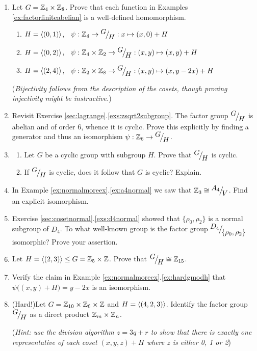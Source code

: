 \begin{exercises}
\begin{enumerate}
	
	 	\item Let $G=\mathbb{Z}_4\times\mathbb{Z}_8$. Prove that each function in Examples \ref{ex:factorfiniteabelian} is a well-defined homomorphism.
		\begin{enumerate}\itemsep0pt
			\item $H=\left\langle (0,1)\right\rangle$, \ $\psi:\mathbb{Z}_4\to\smash[t]{{}^{\textstyle {G}}\!\big/_{\textstyle \!{H}}}:x\mapsto (x,0)+H$
			\item $H=\left\langle (0,2)\right\rangle$, \ $\psi:\mathbb{Z}_4\times\mathbb{Z}_2\to{}^{\textstyle {G}}\!\big/_{\textstyle \!{H}}:(x,y)\mapsto (x,y)+H$
			\item $H=\left\langle (2,4)\right\rangle$, \ $\psi:\mathbb{Z}_2\times\mathbb{Z}_8\to{}^{\textstyle {G}}\!\big/_{\textstyle \!{H}}:(x,y)\mapsto (x,y-2x)+H$
		\end{enumerate}
		(\emph{Bijectivity follows from the description of the cosets, though proving injectivity might be instructive.})
		
		
		\item Revisit Exercise \ref*{sec:lagrange}.\ref{exs:zsqrt2subgroup}. The factor group ${}^{\textstyle {G}}\!\big/_{\textstyle \!{H}}$ is abelian and of order 6, whence it is cyclic. Prove this explicitly by finding a generator and thus an isomorphism $\psi:\mathbb{Z}_6\to{}^{\textstyle {G}}\!\big/_{\textstyle \!{H}}$.
		
		
		\item\begin{enumerate}
	  	\item Let $G$ be a cyclic group with subgroup $H$. Prove that $\smash[b]{{}^{\textstyle {G}}\!\big/_{\textstyle \!{H}}}$ is cyclic.
	  	\item If ${}^{\textstyle {G}}\!\big/_{\textstyle \!{H}}$ is cyclic, does it follow that $G$ is cyclic? Explain.
		\end{enumerate}
	
	
		\item In Example \ref*{ex:normalmoreex}.\ref{ex:a4normal} we saw that $\mathbb{Z}_3\cong{}^{\textstyle {A_4}}\!\big/_{\textstyle \!{V}}$. Find an explicit isomorphism.
	
	
		\item Exercise \ref*{sec:cosetnormal}.\ref{exs:d4normal} showed that $\{\rho_0,\rho_2\}$ is a normal subgroup of $D_4$. To what well-known group is the factor group ${}^{\textstyle {D_4}}\!\big/_{\textstyle \!{\{\rho_0,\rho_2\}}}$ isomorphic? Prove your assertion.
		
		
		\item Let $H=\left\langle (2,3)\right\rangle\le G=\mathbb{Z}_5\times \mathbb{Z}$. Prove that ${}^{\textstyle {G}}\!\big/_{\textstyle \!{H}}\cong \mathbb{Z}_{15}$.
		
		
		\item Verify the claim in Example \ref*{ex:normalmoreex}.\ref{ex:hardgmodh} that $\psi\bigl((x,y)+H\bigr)=y-2x$ is an isomorphism.
		
		
		\item (Hard!)\lstsp Let $G=\mathbb{Z}_{10}\times\mathbb{Z}_6\times\mathbb{Z}$ and $H=\left\langle (4,2,3)\right\rangle$. Identify the factor group ${}^{\textstyle {G}}\!\big/_{\textstyle \!{H}}$ as a direct product $\mathbb{Z}_m\times\mathbb{Z}_n$.\par
		(\emph{Hint: use the division algorithm $z=3q+r$ to show that there is exactly one representative of each coset $(x,y,z)+H$ where $z$ is either 0, 1 or 2})
		

\end{enumerate}
\end{exercises}
